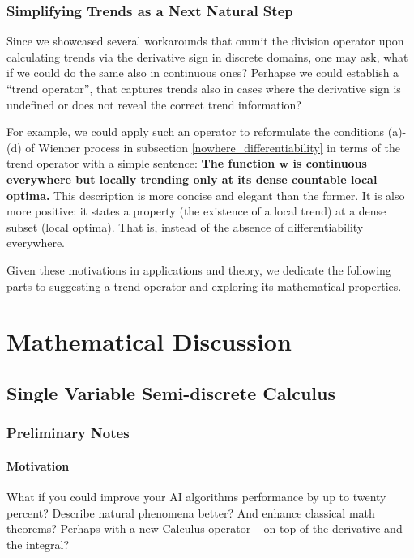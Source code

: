 \documentclass[11pt]{book}
\begin{document}
\section{Simplifying Trends as a Next Natural Step}

Since we showcased several workarounds that ommit the division operator upon calculating trends via the derivative sign in discrete domains, one may ask, what if we could do the same also in continuous ones? Perhapse we could establish a “trend operator”, that captures trends also in cases where the derivative sign is undefined or does not reveal the correct trend information?

For example, we could apply such an operator to reformulate the conditions (a)-(d) of Wienner process in subsection \ref{nowhere_differentiability} in terms of the trend operator with a simple sentence: \textbf{ The function \ensuremath{\boldsymbol{w}} is continuous everywhere but locally trending only at its dense countable local optima. }
This description is more concise and elegant than the former. It is also more positive: it states a property (the existence of a local trend) at a dense subset (local optima). That is, instead of the absence of differentiability everywhere.

Given these motivations in applications and theory, we dedicate the following parts to suggesting a trend operator and exploring its mathematical properties.

\newpage{}


\part{Mathematical Discussion}
\label{mathematical_discussion_part}

\chapter{Single Variable Semi-discrete Calculus}
\section{Preliminary Notes}

\subsection{Motivation}
What if you could improve your AI algorithms performance by up to twenty percent? Describe natural phenomena better? And enhance classical math theorems? Perhaps with a new Calculus operator – on top of the derivative and the integral?
\end{document}
